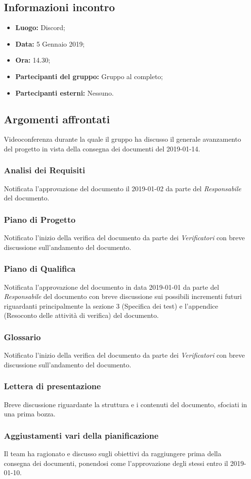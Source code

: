 \subsection{Informazioni incontro}
\begin{itemize}
	\item { \textbf{Luogo:} Discord;  }
	\item { \textbf{Data:} 5 Gennaio 2019; }
	\item { \textbf{Ora:} 14.30; }
	\item { \textbf{Partecipanti del gruppo:} Gruppo al completo;}
	\item { \textbf{Partecipanti esterni:} Nessuno. }
\end{itemize}


\subsection{Argomenti affrontati}
Videoconferenza durante la quale il gruppo ha discusso il generale avanzamento del progetto in vista della consegna dei documenti del 2019-01-14.

\subsubsection{Analisi dei Requisiti}
Notificata l'approvazione del documento il 2019-01-02 da parte del \emph{Responsabile} del documento.
\subsubsection{Piano di Progetto}
Notificato l'inizio della verifica del documento da parte dei \emph{Verificatori} con breve discussione sull'andamento del documento.
\subsubsection{Piano di Qualifica}
Notificata l'approvazione del documento in data 2019-01-01 da parte del \emph{Responsabile} del documento con breve discussione sui possibili incrementi futuri riguardanti principalmente la sezione 3 (Specifica dei test) e l'appendice (Resoconto delle attività di verifica) del documento.
\subsubsection{Glossario}
Notificato l'inizio della verifica del documento da parte dei \emph{Verificatori} con breve discussione sull'andamento del documento.
\subsubsection{Lettera di presentazione}
Breve discussione riguardante la struttura e i contenuti del documento, sfociati in una prima bozza.
\subsubsection{Aggiustamenti vari della pianificazione}
Il team ha ragionato e discusso sugli obiettivi da raggiungere prima della consegna dei documenti, ponendosi come  l'approvazione degli stessi entro il 2019-01-10. 
